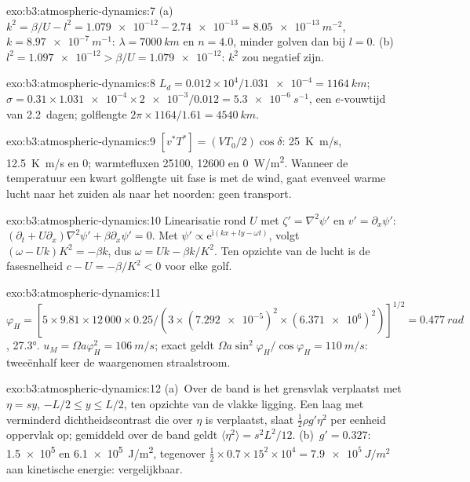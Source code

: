 \begin{solution}{exo:b3:atmospheric-dynamics:7}
(a)~$k^2 = \beta/U - l^2 = \num{1.079e-12} - \num{2.74e-13} =
\qty{8.05e-13}{m^{-2}}$, $k = \qty{8.97e-7}{m^{-1}}$: $\lambda =
\qty{7000}{km}$ en $n = 4.0$, minder golven dan bij $l = 0$. (b)~$l^2 =
\num{1.097e-12} > \beta/U = \num{1.079e-12}$: $k^2$ zou negatief zijn.
\end{solution}

\begin{solution}{exo:b3:atmospheric-dynamics:8}
$L_d = 0.012\times10^4/\num{1.031e-4} = \qty{1164}{km}$; $\sigma =
0.31\times\num{1.031e-4}\times\num{2e-3}/0.012 = \qty{5.3e-6}{s^{-1}}$, een
$e$-vouwtijd van \num{2.2}~dagen; golflengte $2\pi\times1164/1.61 =
\qty{4540}{km}$.
\end{solution}

\begin{solution}{exo:b3:atmospheric-dynamics:9}
$[v^*T^*] = (VT_0/2)\cos\delta$: \qty{25}{K.m/s}, \qty{12.5}{K.m/s} en 0;
warmtefluxen \num{25100}, \num{12600} en \qty{0}{W/m^2}. Wanneer de
temperatuur een kwart golflengte uit fase is met de wind, gaat evenveel warme
lucht naar het zuiden als naar het noorden: geen transport.
\end{solution}

\begin{solution}{exo:b3:atmospheric-dynamics:10}
Linearisatie rond $U$ met $\zeta' = \nabla^2\psi'$ en $v' =
\partial_x\psi'$: $(\partial_t + U\partial_x)\nabla^2\psi' + \beta\partial_x
\psi' = 0$. Met $\psi' \propto \mathrm e^{\mathrm i(kx + ly - \omega t)}$,
volgt $(\omega - Uk)K^2 = -\beta k$, dus $\omega = Uk - \beta k/K^2$. Ten
opzichte van de lucht is de fasesnelheid $c - U = -\beta/K^2 < 0$ voor elke golf.
\end{solution}

\begin{solution}{exo:b3:atmospheric-dynamics:11}
$\varphi_H = [5\times9.81\times12\,000\times0.25/(3\times(\num{7.292e-5})^2
\times(\num{6.371e6})^2)]^{1/2} = \qty{0.477}{rad}$, \ang{27.3}.
$u_M = \Omega a\varphi_H^2 = \qty{106}{m/s}$; exact geldt $\Omega a\sin^2
\varphi_H/\cos\varphi_H = \qty{110}{m/s}$: tweeënhalf keer de
waargenomen straalstroom.
\end{solution}

\begin{solution}{exo:b3:atmospheric-dynamics:12}
(a)~Over de band is het grensvlak verplaatst met $\eta = sy$, $-L/2 \le y
\le L/2$, ten opzichte van de vlakke ligging. Een laag met verminderd dichtheidscontrast
die over $\eta$ is verplaatst, slaat $\tfrac12\rho g'\eta^2$ per eenheid oppervlak op; gemiddeld
over de band geldt $\langle\eta^2\rangle = s^2L^2/12$. (b)~$g' = 0.327$:
\num{1.5e5} en \qty{6.1e5}{J/m^2}, tegenover $\tfrac12\times0.7\times15^2
\times10^4 = \qty{7.9e5}{J/m^2}$ aan kinetische energie: vergelijkbaar.
\end{solution}

